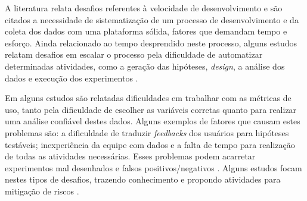 A literatura relata desafios referentes à velocidade de desenvolvimento e são citados a necessidade de sistematização de um processo de desenvolvimento e da coleta dos dados com uma plataforma sólida, fatores que demandam tempo e esforço. Ainda relacionado ao tempo desprendido neste processo, alguns estudos relatam desafios em escalar o processo pela dificuldade de automatizar determinadas atividades, como a geração das hipóteses, \textit{design}, a análise dos dados e execução dos experimentos \cite{erthal_characterization_2023} \cite{fabijan_evolution_2017}  \cite{sauvola_towards_2015} \cite{quin_b_2024} \cite{fernandes_hitting_2015} \cite{fagerholm_right_2017} \cite{kevic_characterizing_2017} \cite{kohavi_online_2013} \cite{bures_infrastructure_2021} \cite{liu_enterprise-level_2019} \cite{chen_automatic_2018} \cite{fabijan_online_2020} \cite{le_goues_towards_2014}.

Em alguns estudos são relatadas dificuldades em trabalhar com as métricas de uso, tanto pela dificuldade de escolher as variáveis corretas quanto para realizar uma análise confiável destes dados. Alguns exemplos de fatores que causam estes problemas são: a dificuldade de traduzir \textit{feedbacks} dos usuários para hipóteses testáveis; inexperiência da equipe com dados e a falta de tempo para realização de todas as atividades necessárias. Esses problemas podem acarretar experimentos mal desenhados e falsos positivos/negativos \cite{quin_b_2024} \cite{erthal_characterization_2023} \cite{issa_mattos_hurrier_2023} \cite{fabijan_evolution_2017} \cite{fernandes_hitting_2015} \cite{fabijan_three_2019} \cite{kuhrmann_activity_2018} \cite{fagerholm_right_2017} \cite{olsson_towards_2015} \cite{kevic_characterizing_2017} \cite{crook_seven_2009} \cite{kohavi_online_2013} \cite{yu_new_2020} \cite{liu_enterprise-level_2019} \cite{kohavi_online_2013} \cite{fabijan_benefits_2017} \cite{le_goues_towards_2014} \cite{larsen_statistical_2024}. Alguns estudos focam nestes tipos de desafios, trazendo conhecimento e propondo atividades para mitigação de riscos \cite{kohavi_seven_2014} \cite{larsen_statistical_2024}.

